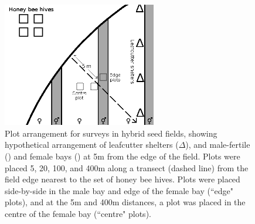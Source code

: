 \begin{figure}
    \centering
    \includegraphics[width=0.6\textwidth,keepaspectratio=true]{seedfieldPlots.png}
    \caption[Plot arrangement for surveys in hybrid seed fields]{Plot arrangement for surveys in hybrid seed fields, showing hypothetical arrangement of leafcutter shelters ($\Delta$), and male-fertile (\Hermaphrodite) and female bays (\Female) at 5m from the edge of the field. Plots were placed 5, 20, 100, and 400m along a transect (dashed line) from the field edge nearest to the set of honey bee hives. Plots were placed side-by-side in the male bay and edge of the female bay (``edge" plots), and at the 5m and 400m distances, a plot was placed in the centre of the female bay (``centre" plots).}
    \label{fig:seedfieldPlots}
\end{figure}


